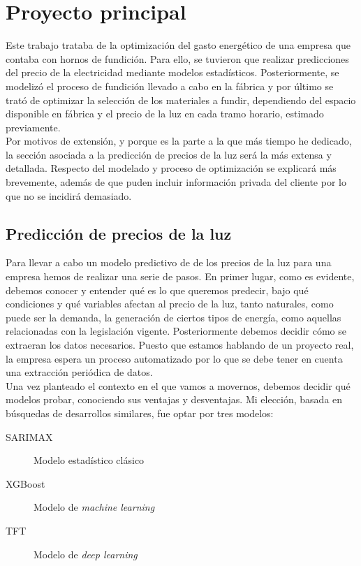 \section{Proyecto principal}
%
%
Este trabajo trataba de la optimización del gasto energético de una empresa que contaba con hornos de fundición. Para ello, se tuvieron que realizar predicciones del precio de la electricidad mediante modelos estadísticos. Posteriormente, se modelizó el proceso de fundición llevado a cabo en la fábrica y por último se trató de optimizar la selección de los materiales a fundir, dependiendo del espacio disponible en fábrica y el precio de la luz en cada tramo horario, estimado previamente.\\

Por motivos de extensión, y porque es la parte a la que más tiempo he dedicado, la sección asociada a la predicción de precios de la luz será la más extensa y detallada. Respecto del modelado y proceso de optimización se explicará más brevemente, además de que puden incluir información privada del cliente por lo que no se incidirá demasiado.
%
%
\subsection{Predicción de precios de la luz}
%
%
%
%
Para llevar a cabo un modelo predictivo de de los precios de la luz para una empresa hemos de realizar una serie de pasos. En primer lugar, como es evidente, debemos conocer y entender qué es lo que queremos predecir, bajo qué condiciones y qué variables afectan al precio de la luz, tanto naturales, como puede ser la demanda, la generación de ciertos tipos de energía, como aquellas relacionadas con la legislación vigente. Posteriormente debemos decidir cómo se extraeran los datos necesarios. Puesto que estamos hablando de un proyecto real, la empresa espera un proceso automatizado por lo que se debe tener en cuenta una extracción periódica de datos.\\

Una vez planteado el contexto en el que vamos a movernos, debemos decidir qué modelos probar, conociendo sus ventajas y desventajas. Mi elección, basada en búsquedas de desarrollos similares, fue optar por tres modelos:
\begin{description}
    \item[SARIMAX] Modelo estadístico clásico
    \item[XGBoost] Modelo de \textit{machine learning}
    \item[TFT] Modelo de \textit{deep learning}
\end{description}


